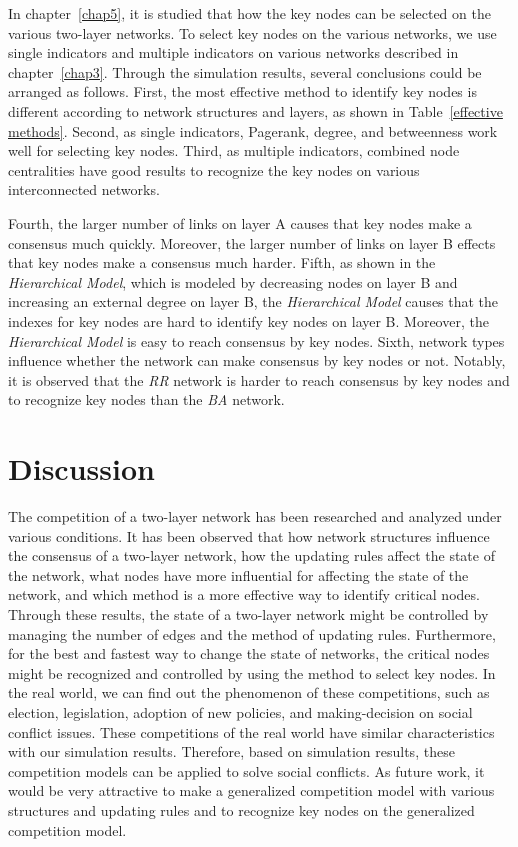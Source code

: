 In chapter~\ref{chap5}, it is studied that how the key nodes can be selected on the various two-layer networks. To select key nodes on the various networks, we use single indicators and multiple indicators on various networks described in chapter~\ref{chap3}. Through the simulation results, several conclusions could be arranged as follows. First, the most effective method to identify key nodes is different according to network structures and layers, as shown in Table~\ref{effective methods}. Second, as single indicators, Pagerank, degree, and betweenness work well for selecting key nodes. Third, as multiple indicators, combined node centralities have good results to recognize the key nodes on various interconnected networks. 

Fourth, the larger number of links on layer A causes that key nodes make a consensus much quickly. Moreover, the larger number of links on layer B effects that key nodes make a consensus much harder. Fifth, as shown in the \textit{Hierarchical Model}, which is modeled by decreasing nodes on layer B and increasing an external degree on layer B, the \textit{Hierarchical Model} causes that the indexes for key nodes are hard to identify key nodes on layer B. Moreover, the \textit{Hierarchical Model} is easy to reach consensus by key nodes. Sixth, network types influence whether the network can make consensus by key nodes or not. Notably, it is observed that the \textit{RR} network is harder to reach consensus by key nodes and to recognize key nodes than the \textit{BA} network. \\
  
\section{Discussion} 
The competition of a two-layer network has been researched and analyzed under various conditions. It has been observed that how network structures influence the consensus of a two-layer network, how the updating rules affect the state of the network, what nodes have more influential for affecting the state of the network, and which method is a more effective way to identify critical nodes. Through these results, the state of a two-layer network might be controlled by managing the number of edges and the method of updating rules. Furthermore, for the best and fastest way to change the state of networks, the critical nodes might be recognized and controlled by using the method to select key nodes.
In the real world, we can find out the phenomenon of these competitions, such as election, legislation, adoption of new policies, and making-decision on social conflict issues. These competitions of the real world have similar characteristics with our simulation results. Therefore, based on simulation results, these competition models can be applied to solve social conflicts. As future work, it would be very attractive to make a generalized competition model with various structures and updating rules and to recognize key nodes on the generalized competition model.\\   


